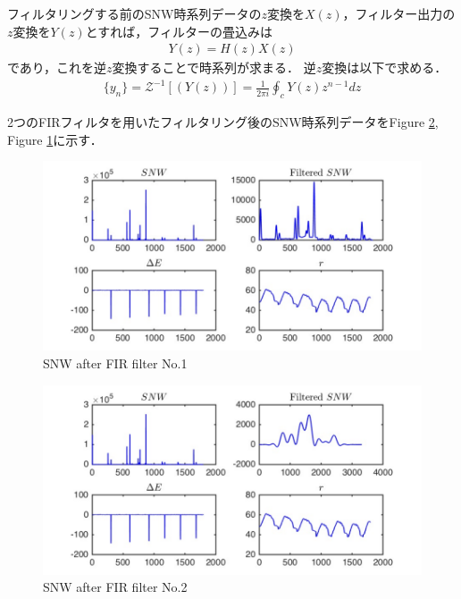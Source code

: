 \documentclass[twocolumn,oneside,a4paper]{article}
\begin{document}
フィルタリングする前のSNW時系列データの$z$変換を$X(z)$，フィルター出力の$z$変換を$Y(z)$とすれば，フィルターの畳込みは
\begin{eqnarray*}
	Y(z) = H(z) X(z)
\end{eqnarray*}
であり，これを逆$z$変換することで時系列が求まる．
逆$z$変換は以下で求める．
\begin{eqnarray*}
	\{y_n\} = \mathcal{Z}^{-1}[(Y(z))] = \frac{1}{2 \pi i} \oint_c Y(z) z^{n-1} dz
\end{eqnarray*}

2つのFIRフィルタを用いたフィルタリング後のSNW時系列データをFigure \ref{fig:filtered}, Figure \ref{fig:filtered2}に示す．

\begin{figure}[htbp]
    \includegraphics[bb=0 0 432 216,width=1\columnwidth]{snw_filtered.pdf}
    \caption{SNW after FIR filter No.1}
   \label{fig:filtered2}
\end{figure}

\begin{figure}[htbp]
    \includegraphics[bb=0 0 432 216,width=1\columnwidth]{gcodesim_filtered.pdf}
    \caption{SNW after FIR filter No.2}
   \label{fig:filtered}
\end{figure}
\end{document}
